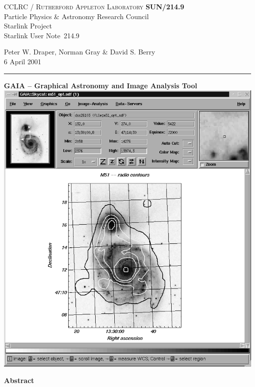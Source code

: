 \documentclass[twoside,11pt]{article}
\newcommand{\stardoccategory}  {Starlink User Note}
\newcommand{\stardocinitials}  {SUN}
\newcommand{\stardocnumber}    {214.9}
\newcommand{\stardocauthors}   {Peter W. Draper, Norman Gray \& David S. Berry}
\newcommand{\stardocdate}      {6 April 2001}
\newcommand{\stardoctitle}     {GAIA -- Graphical Astronomy and
                                Image Analysis Tool}
\newcommand{\stardocname}{\stardocinitials /\stardocnumber}
\newenvironment{latexonly}{}{}
\renewcommand{\_}{\texttt{\symbol{95}}}
\begin{document}
\thispagestyle{empty}

\begin{latexonly}
   CCLRC / \textsc{Rutherford Appleton Laboratory} \hfill \textbf{\stardocname}\\
   {\large Particle Physics \& Astronomy Research Council}\\
   {\large Starlink Project\\}
   {\large \stardoccategory\ \stardocnumber}
   \begin{flushright}
   \stardocauthors\\
   \stardocdate
   \end{flushright}
   \vspace{-4mm}
   \rule{\textwidth}{0.5mm}
   \vspace{5mm}
   \begin{center}
   {\Large\textbf{\stardoctitle \\ [2.5ex]}}
   \vspace{5mm}
   \includegraphics[totalheight=5in]{sun214fig.ps}
   \end{center}

   \begin{center}
      {\Large\textbf{Abstract}}
   \end{center}
\end{latexonly}
\end{document}
